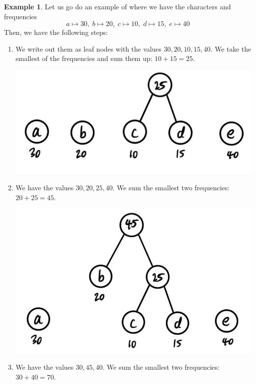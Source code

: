 \documentclass{article}
\theoremstyle{definition}
\newtheorem{example}{Example}[section]
\theoremstyle{remark}
\theoremstyle{definition}
\begin{document}
\begin{example}
Let us go do an example of where we have the characters and frequencies 
\[a \mapsto 30, \; b \mapsto 20, \; c \mapsto 10, \; d \mapsto 15, \; e \mapsto 40\]
Then, we have the following steps: 
\begin{enumerate}
    \item We write out them as leaf nodes with the values $30, 20, 10, 15, 40$. We take the smallest of the frequencies and sum them up: $10 + 15 = 25$. 
    \begin{center}
        \includegraphics[scale=0.3]{img/step_1.jpg}
    \end{center}
    \item We have the values $30, 20, 25, 40$. We sum the smallest two frequencies: $20 + 25 = 45$. 
    \begin{center}
        \includegraphics[scale=0.3]{img/step_2.jpg}
    \end{center}
    \item We have the values $30, 45, 40$. We sum the smallest two frequencies: $30 + 40 = 70$. 
    \begin{center}

\end{center}
\end{enumerate}
\end{example}
\end{document}
